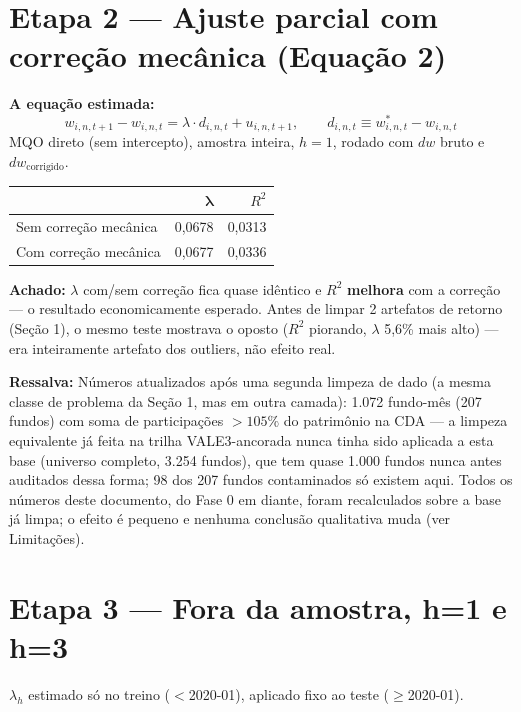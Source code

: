 \documentclass[11pt,a4paper]{article}
\newcommand{\equacao}[0]{\par\vspace{4pt}\noindent\textbf{\color{vermelho}A equação estimada:}\ }
\newcommand{\aha}[1]{\par\vspace{4pt}\noindent\textbf{\color{vermelho}Achado:} #1\par\vspace{2pt}}
\newcommand{\ressalva}[1]{\par\vspace{4pt}\noindent\textbf{\color{verde}Ressalva:} #1\par\vspace{2pt}}
\begin{document}
\section{Etapa 2 --- Ajuste parcial com correção mecânica (Equação 2)}

\equacao
$$w_{i,n,t+1} - w_{i,n,t} = \lambda \cdot d_{i,n,t} + u_{i,n,t+1}, \qquad
d_{i,n,t} \equiv w^*_{i,n,t} - w_{i,n,t}$$
MQO direto (sem intercepto), amostra inteira, $h=1$, rodado com $dw$ bruto e
$dw_{\text{corrigido}}$.

\begin{center}\small
\begin{tabular}{lrr}
\toprule
 & $\boldsymbol\lambda$ & $R^2$ \\
\midrule
Sem correção mecânica & 0,0678 & 0,0313 \\
Com correção mecânica & 0,0677 & 0,0336 \\
\bottomrule
\end{tabular}
\end{center}

\aha{$\lambda$ com/sem correção fica quase idêntico e $R^2$ \textbf{melhora} com a correção
--- o resultado economicamente esperado. Antes de limpar 2 artefatos de retorno (Seção 1), o
mesmo teste mostrava o oposto ($R^2$ piorando, $\lambda$ 5,6\% mais alto) --- era inteiramente
artefato dos outliers, não efeito real.}

\ressalva{Números atualizados após uma segunda limpeza de dado (a mesma classe de problema da
Seção 1, mas em outra camada): 1.072 fundo-mês (207 fundos) com soma de participações
$>105\%$ do patrimônio na CDA --- a limpeza equivalente já feita na trilha VALE3-ancorada
nunca tinha sido aplicada a esta base (universo completo, 3.254 fundos), que tem quase 1.000
fundos nunca antes auditados dessa forma; 98 dos 207 fundos contaminados só existem aqui. Todos
os números deste documento, do Fase 0 em diante, foram recalculados sobre a base já limpa; o
efeito é pequeno e nenhuma conclusão qualitativa muda (ver Limitações).}

\section{Etapa 3 --- Fora da amostra, h=1 e h=3}

$\lambda_h$ estimado só no treino ($<$2020-01), aplicado fixo ao teste ($\geq$2020-01).
\end{document}
